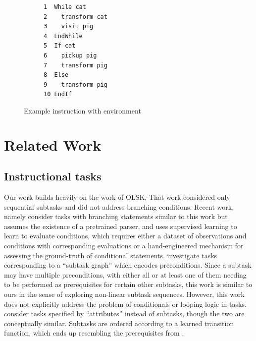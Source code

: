 \documentclass{article}
\begin{document}
\begin{figure}[t]
\vskip 0.1in
  \centering
  \begin{subfigure}{.2\columnwidth}
    \centering
  \end{subfigure}%
  \hfill
  \begin{subfigure}{.45\columnwidth}
    \centering
\begin{lstlisting}[]
1  While cat
2    transform cat
3    visit pig
4  EndWhile
5  If cat
6    pickup pig
7    transform pig
8  Else
9    transform pig
10 EndIf
\end{lstlisting}
  \end{subfigure}%
  \hfill
  \caption{Example instruction with environment}
\vskip -0.3in
\end{figure}

\section{Related Work}
\subsection{Instructional tasks}
Our work builds heavily on the work of OLSK. That work considered
only sequential subtasks and did not address branching conditions. Recent work,
namely \citet{sun2020program} consider tasks with branching statements similar
to this work but assumes the existence of a pretrained parser, and uses
supervised learning to learn to evaluate conditions, which requires either a
dataset of observations and conditions with corresponding evaluations or a
hand-engineered mechanism for assessing the ground-truth of conditional
statements. \citet{sohn2018hierarchical} investigate tasks corresponding to a
``subtask graph'' which encodes preconditions. Since a subtask may have multiple
preconditions, with either all or at least one of them needing to be performed
as prerequisites for certain other subtasks, this work is similar to ours in the
sense of exploring non-linear subtask sequences. However, this work does not
explicitly address the problem of conditionals or looping logic in tasks.
\citet{zhang2018composable} consider tasks specified by ``attributes'' instead
of subtasks, though the two are conceptually similar. Subtasks are ordered
according to a learned transition function, which ends up resembling the
prerequisites from \citet{sohn2018hierarchical}. 
\end{document}

